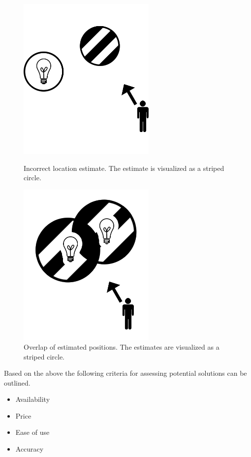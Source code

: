 \begin{figure}[!htb]
    \centering
    \begin{minipage}[t]{0.45\textwidth}
        \centering
        \includegraphics[width=0.6\textwidth]{images/incorrect-positioning-estimate.png}
        \caption{Incorrect location estimate. The estimate is visualized as a striped circle.}
        \label{fig:indoor-positioning:incorrect}
    \end{minipage}\qquad
    \begin{minipage}[t]{0.45\textwidth}
        \centering
        \includegraphics[width=0.6\textwidth]{images/positioning-overlap.png}
        \caption{Overlap of estimated positions. The estimates are visualized as a striped circle.}
        \label{fig:indoor-positioning:overlap}
    \end{minipage}
\end{figure}

Based on the above the following criteria for assessing potential solutions can be outlined.

\begin{itemize}
    \item Availability
    \item Price
    \item Ease of use
    \item Accuracy
\end{itemize}

